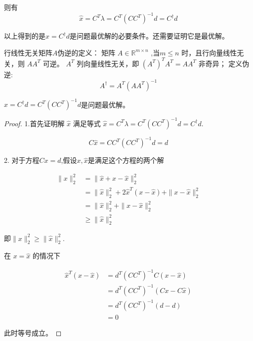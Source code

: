 则有
\begin{equation}
\hat{x}=C^{T} \lambda=C^{T}\left(C C^{T}\right)^{-1} d=C^{\dagger} d
\end{equation}

以上得到的是$\hat{x}=C^{\dagger} d$是问题最优解的必要条件。还需要证明它是最优解。

\begin{remark}行线性无关矩阵$A$伪逆的定义：
    矩阵 $  {A} \in \mathbb{R}^{m \times n} $ ,当$m \leq  {n} $ 时，且行向量线性无关，则 $ A A^{T} $ 可逆。 $ A^{T} $ 列向量线性无关，即 $ \left(A^{T}\right)^{T} A^{T}= {A} A^{T} $ 非奇异；
    定义伪逆:
    \begin{equation}
    A^{\dagger}=A^{T}\left(A A^{T}\right)^{-1}
    \end{equation}
\end{remark}

\begin{theorem}
    $\hat{x}=C^{\dagger} d=C^{T}\left(C C^{T}\right)^{-1} d$是问题最优解。
\end{theorem}

\begin{proof}
    1.首先证明解 $ \hat{x} $ 满足等式 $ \hat{x}=C^{T} \lambda=C^{T}\left(C C^{T}\right)^{-1} d=C^{\dagger} d $.

\begin{equation}
C \hat{x}=C C^{T}\left(C C^{T}\right)^{-1} d=d
\end{equation}

2. 对于方程$Cx=d$,假设$x , \hat{x}$是满足这个方程的两个解

\begin{equation}
    \begin{aligned}
    \|x\|_{2}^{2} &=\|\hat{x}+x-\hat{x}\|_{2}^{2} \\
    &=\|\hat{x}\|_{2}^{2}+2 \hat{x}^{T}(x-\hat{x})+\|x-\hat{x}\|_{2}^{2} \\
    &=\|\hat{x}\|_{2}^{2}+\|x-\hat{x}\|_{2}^{2} \\
    & \ge \|\hat{x}\|_{2}^{2}
    \end{aligned}
    \end{equation}

    即$\|x\|_{2}^{2} \ge \|\hat{x}\|_{2}^{2}$.

在 $  x = \hat{x} $ 的情况下

\begin{equation}
\begin{aligned}
\hat{x}^{T}(x-\hat{x}) &=d^{T}\left(C C^{T}\right)^{-1} C(x-\hat{x}) \\
&=d^{T}\left(C C^{T}\right)^{-1}(C x-C \hat{x}) \\
&=d^{T}\left(C C^{T}\right)^{-1}(d-d) \\
&=0
\end{aligned}
\end{equation}

此时等号成立。
\end{proof}

